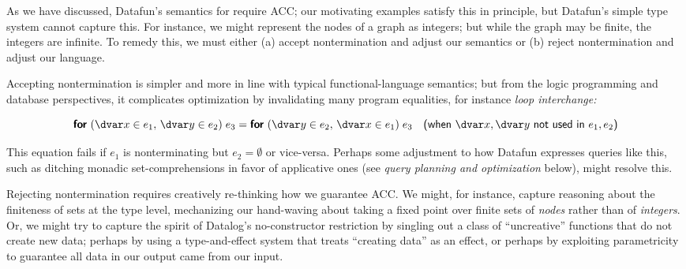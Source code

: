 As we have discussed, Datafun's semantics for  require ACC; our motivating examples satisfy this in principle, but Datafun's simple type system cannot capture this. For instance, we might represent the nodes of a graph as integers; but while the graph may be finite, the integers are infinite. To remedy this, we must either (a) accept nontermination and adjust our semantics or (b) reject nontermination and adjust our language.

Accepting nontermination is simpler and more in line with typical functional-language semantics; but from the logic programming and database perspectives, it complicates optimization by invalidating many program equalities, for instance \emph{loop interchange:}

\begin{equation*}
  \efor{\dvar x \in e_1,\, \dvar y \in e_2}{e_3}
  =
  \efor{\dvar y \in e_2,\, \dvar x \in e_1}{e_3}
  \quad\textsf{(when $\dvar x,\dvar y$ not used in $e_1,e_2$)}
\end{equation*}



\noindent
This equation fails if $e_1$ is nonterminating but $e_2 = \emptyset$ or vice-versa. Perhaps some adjustment to how Datafun expresses queries like this, such as ditching monadic set-comprehensions in favor of applicative ones (see \emph{query planning and optimization} below), might resolve this.

Rejecting nontermination requires creatively re-thinking how we guarantee ACC. We might, for instance, capture reasoning about the finiteness of sets at the type level, mechanizing our hand-waving about taking a fixed point over finite sets of \emph{nodes} rather than of \emph{integers}. Or, we might try to capture the spirit of Datalog's no-constructor restriction by singling out a class of ``uncreative'' functions that do not create new data; perhaps by using a type-and-effect system that treats ``creating data'' as an effect,\footnotemark{} or perhaps by exploiting parametricity to guarantee all data in our output came from our input.

\newcommand\bless{\name{Bless}}
\newcommand\holy{\name{Holy}}

